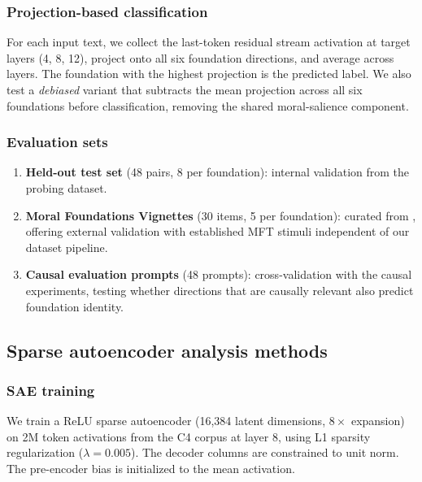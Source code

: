 \subsubsection{Projection-based classification}\label{projection-based-classification}

For each input text, we collect the last-token residual stream activation at target layers (4, 8, 12), project onto all six foundation directions, and average across layers.
The foundation with the highest projection is the predicted label.
We also test a \emph{debiased} variant that subtracts the mean projection across all six foundations before classification, removing the shared moral-salience component.

\subsubsection{Evaluation sets}\label{evaluation-sets}

\begin{enumerate}
\def\labelenumi{\arabic{enumi}.}
\tightlist
\item
  \textbf{Held-out test set} (48 pairs, 8 per foundation): internal validation from the probing dataset.
\item
  \textbf{Moral Foundations Vignettes} (30 items, 5 per foundation): curated from \citet{clifford2015moral}, offering external validation with established MFT stimuli independent of our dataset pipeline.
\item
  \textbf{Causal evaluation prompts} (48 prompts): cross-validation with the causal experiments, testing whether directions that are causally relevant also predict foundation identity.
\end{enumerate}

\subsection{Sparse autoencoder analysis methods}\label{sparse-autoencoder-analysis-methods}

\subsubsection{SAE training}\label{sae-training}

We train a ReLU sparse autoencoder (16,384 latent dimensions, \(8\times\) expansion) on 2M token activations from the C4 corpus \citep{raffel2020c4} at layer 8, using L1 sparsity regularization (\(\lambda = 0.005\)).
The decoder columns are constrained to unit norm.
The pre-encoder bias is initialized to the mean activation.

